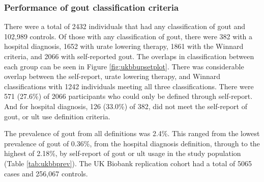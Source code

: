 \documentclass[]{report}
\begin{document}
\subsubsection{Performance of gout classification
criteria}\label{performance-of-gout-classification-criteria}

There were a total of 2432 individuals that had any classification of
gout and 102,989 controls. Of those with any classification of gout,
there were 382 with a hospital diagnosis, 1652 with urate lowering
therapy, 1861 with the Winnard criteria, and 2066 with self-reported
gout. The overlaps in classification between each group can be seen in
Figure \ref{fig:ukbbupsetplot}. There was considerable overlap between
the self-report, urate lowering therapy, and Winnard classifications
with 1242 individuals meeting all three classifications. There were 571
(27.6\%) of 2066 participants who could only be defined through
self-report. And for hospital diagnosis, 126 (33.0\%) of 382, did not
meet the self-report of gout, or \gls{ult} use definition criteria.

The prevalence of gout from all definitions was 2.4\%. This ranged from
the lowest prevalence of gout of 0.36\%, from the hospital diagnosis
definition, through to the highest of 2.18\%, by self-report of gout or
\gls{ult} usage in the study population (Table \ref{tab:ukbbprev}). The
UK Biobank replication cohort had a total of 5065 cases and 256,067
controls.
\end{document}
